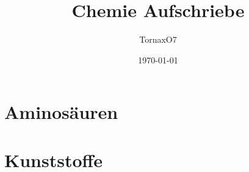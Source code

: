 \documentclass[a4paper, 12pt]{scrartcl}
\title{Chemie Aufschriebe}
\author{TornaxO7}
\date{\today}
\begin{document}
\maketitle
\tableofcontents
\section{Aminosäuren}

\section{Kunststoffe}






%
\end{document}

